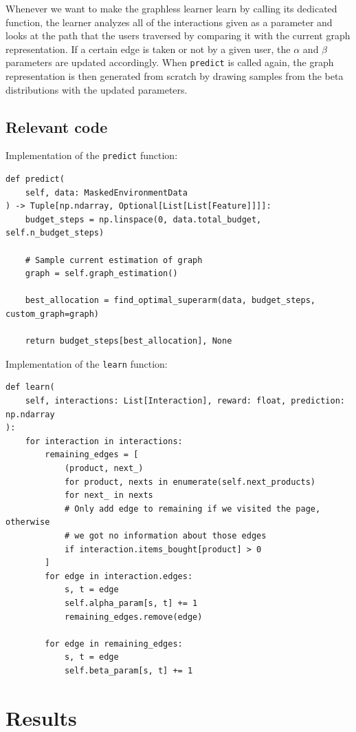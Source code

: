 Whenever we want to make the graphless learner learn by calling its dedicated function, the learner analyzes all of the interactions given as a parameter and looks at the path that the users traversed by comparing it with the current graph representation.
If a certain edge is taken or not by a given user, the $\alpha$ and $\beta$ parameters are updated accordingly.
When \texttt{predict} is called again, the graph representation is then generated from scratch by drawing samples from the beta distributions with the updated parameters.

\subsection{Relevant code}

Implementation of the \texttt{predict} function:

\begin{lstlisting}[style=Python]
def predict(
	self, data: MaskedEnvironmentData
) -> Tuple[np.ndarray, Optional[List[List[Feature]]]]:
	budget_steps = np.linspace(0, data.total_budget, self.n_budget_steps)

	# Sample current estimation of graph
	graph = self.graph_estimation()

	best_allocation = find_optimal_superarm(data, budget_steps, custom_graph=graph)

	return budget_steps[best_allocation], None\end{lstlisting}

Implementation of the \texttt{learn} function:

\begin{lstlisting}[style=Python]
def learn(
	self, interactions: List[Interaction], reward: float, prediction: np.ndarray
):
	for interaction in interactions:
		remaining_edges = [
			(product, next_)
			for product, nexts in enumerate(self.next_products)
			for next_ in nexts
			# Only add edge to remaining if we visited the page, otherwise
			# we got no information about those edges
			if interaction.items_bought[product] > 0
		]
		for edge in interaction.edges:
			s, t = edge
			self.alpha_param[s, t] += 1
			remaining_edges.remove(edge)

		for edge in remaining_edges:
			s, t = edge
			self.beta_param[s, t] += 1
\end{lstlisting}

\section{Results}

